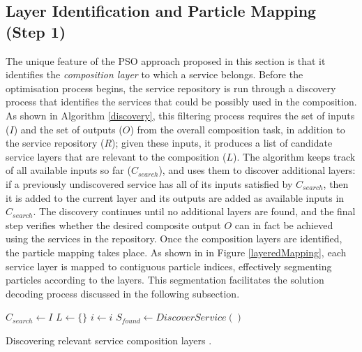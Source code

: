 \documentclass{llncs}
\begin{document}
\subsection{Layer Identification and Particle Mapping (Step 1)}

The unique feature of the PSO approach proposed in this section is that it identifies the \textit{composition layer} to which a service belongs. Before the optimisation process begins, the service repository is run through a discovery process \cite{wang2013genetic} that identifies the services that could be possibly used in the composition. As shown in Algorithm \ref{discovery}, this filtering process requires the set of inputs ($I$) and the set of outputs ($O$) from the overall composition task, in addition to the service repository ($R$); given these inputs, it produces a list of candidate service layers that are relevant to the composition ($L$). The algorithm keeps track of all available inputs so far ($C_{search}$), and uses them to discover additional layers: if a previously undiscovered service has all of its inputs satisfied by $C_{search}$, then it is added to the current layer and its outputs are added as available inputs in $C_{search}$. The discovery continues until no additional layers are found, and the final step verifies whether the desired composite output $O$ can in fact be achieved using the services in the repository. Once the composition layers are identified, the particle mapping takes place. As shown in in Figure \ref{layeredMapping}, each service layer is mapped to contiguous particle indices, effectively segmenting particles according to the layers. This segmentation facilitates the solution decoding process discussed in the following subsection.

\begin{algorithm}
\setlength{}
 \LinesNumbered
 \SetNlSty{}{}{:}
 $C_{search} \leftarrow I$\;
 $L \leftarrow \{\}$\;
 $i \leftarrow i$\;
 $S_{found} \leftarrow DiscoverService()$\;
\caption{Discovering relevant service composition layers \cite{wang2013genetic}.}
\label{discovery}
\end{algorithm}
\end{document}
